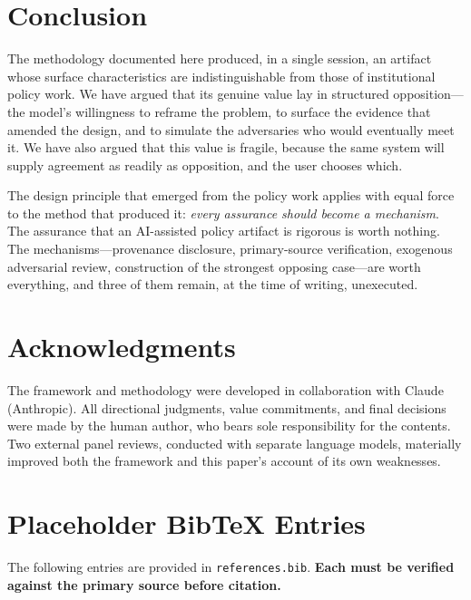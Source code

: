 \documentclass[11pt,a4paper]{article}
\begin{document}
\section{Conclusion}
\label{sec:conclusion}

The methodology documented here produced, in a single session, an artifact whose surface characteristics are indistinguishable from those of institutional policy work. We have argued that its genuine value lay in structured opposition---the model's willingness to reframe the problem, to surface the evidence that amended the design, and to simulate the adversaries who would eventually meet it. We have also argued that this value is fragile, because the same system will supply agreement as readily as opposition, and the user chooses which.

The design principle that emerged from the policy work applies with equal force to the method that produced it: \emph{every assurance should become a mechanism}. The assurance that an AI-assisted policy artifact is rigorous is worth nothing. The mechanisms---provenance disclosure, primary-source verification, exogenous adversarial review, construction of the strongest opposing case---are worth everything, and three of them remain, at the time of writing, unexecuted.

\section*{Acknowledgments}
The framework and methodology were developed in collaboration with Claude (Anthropic). All directional judgments, value commitments, and final decisions were made by the human author, who bears sole responsibility for the contents. Two external panel reviews, conducted with separate language models, materially improved both the framework and this paper's account of its own weaknesses.



\appendix
\section{Placeholder BibTeX Entries}

The following entries are provided in \texttt{references.bib}. \textbf{Each must be verified against the primary source before citation.}
\end{document}
